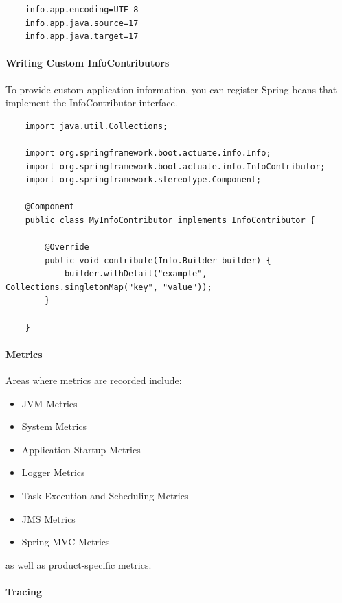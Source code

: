 \documentclass{scrartcl}
\begin{document}
    \begin{lstlisting}
    info.app.encoding=UTF-8
    info.app.java.source=17
    info.app.java.target=17

    \end{lstlisting}

\paragraph{Writing Custom InfoContributors}

    To provide custom application information, you can register Spring beans that implement the InfoContributor interface.

\begin{lstlisting}
    import java.util.Collections;

    import org.springframework.boot.actuate.info.Info;
    import org.springframework.boot.actuate.info.InfoContributor;
    import org.springframework.stereotype.Component;

    @Component
    public class MyInfoContributor implements InfoContributor {

        @Override
        public void contribute(Info.Builder builder) {
            builder.withDetail("example", Collections.singletonMap("key", "value"));
        }

    }
\end{lstlisting}

\paragraph{Metrics}

Areas where metrics are recorded include:

\begin{itemize}
    \item JVM Metrics
    \item System Metrics
    \item Application Startup Metrics
    \item Logger Metrics
    \item Task Execution and Scheduling Metrics
    \item JMS Metrics
    \item Spring MVC Metrics
\end{itemize}

as well as product-specific metrics.

\paragraph{Tracing}
\end{document}
